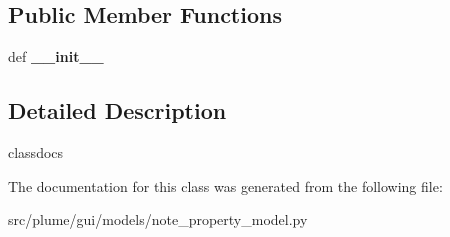 \subsection*{Public Member Functions}
\begin{DoxyCompactItemize}
\item 
def {\bfseries \+\_\+\+\_\+init\+\_\+\+\_\+}\hypertarget{classplume-creator_1_1src_1_1plume_1_1gui_1_1models_1_1note__property__model_1_1_note_property_model_a93216a5c1994385e6fd5c9f55ad4fcc6}{}\label{classplume-creator_1_1src_1_1plume_1_1gui_1_1models_1_1note__property__model_1_1_note_property_model_a93216a5c1994385e6fd5c9f55ad4fcc6}

\end{DoxyCompactItemize}


\subsection{Detailed Description}
classdocs 

The documentation for this class was generated from the following file\+:\begin{DoxyCompactItemize}
\item 
src/plume/gui/models/note\+\_\+property\+\_\+model.\+py\end{DoxyCompactItemize}
